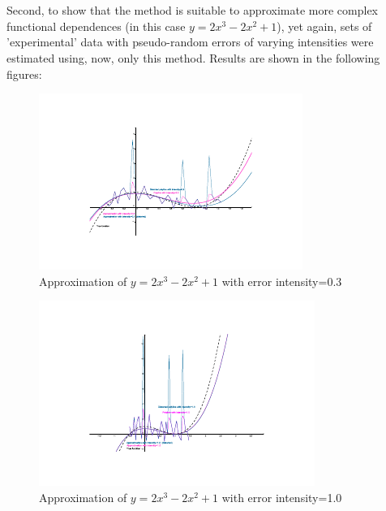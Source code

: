 \\ \\Second, to show that the method is suitable to approximate more complex functional dependences (in this case $y=2x^{3}-2x^{2}+1$), yet again, sets of 'experimental' data with pseudo-random errors of varying intensities were estimated using, now, only this method. Results are shown in the following figures: 
\begin{figure}[h!]%
\centering
\includegraphics[scale=2.5]{pic-prog2-c-not3}
\caption{Approximation of $y=2x^{3}-2x^{2}+1$ with error intensity=0.3}
\label{fig:results-1}
\end{figure}
\begin{figure}[h!]%
\centering
\includegraphics[scale=2.5]{pic-prog2-c-1}
\caption{Approximation of $y=2x^{3}-2x^{2}+1$ with error intensity=1.0}%
\label{fig:results-2}%
\end{figure}
\newpage
